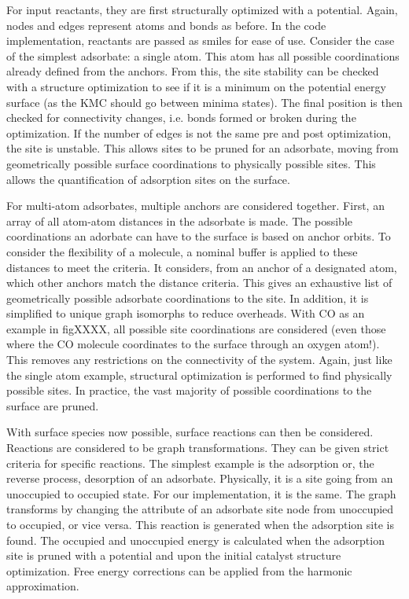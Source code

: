 \documentclass[journal=jacsat,manuscript=article]{achemso}
\begin{document}
For input reactants, they are first structurally optimized with a potential.
Again, nodes and edges represent atoms and bonds as before.
In the code implementation, reactants are passed as smiles for ease of use.
Consider the case of the simplest adsorbate: a single atom.
This atom has all possible coordinations already defined from the anchors.
From this, the site stability can be checked with a structure optimization to see if it is a minimum on the potential energy surface (as the KMC should go between minima states).
The final position is then checked for connectivity changes, i.e. bonds formed or broken during the optimization.
If the number of edges is not the same pre and post optimization, the site is unstable.
This allows sites to be pruned for an adsorbate, moving from geometrically possible surface coordinations to physically possible sites.
This allows the quantification of adsorption sites on the surface.

For multi-atom adsorbates, multiple anchors are considered together.
First, an array of all atom-atom distances in the adsorbate is made.
The possible coordinations an adorbate can have to the surface is based on anchor orbits.
To consider the flexibility of a molecule, a nominal buffer is applied to these distances to meet the criteria.
It considers, from an anchor of a designated atom, which other anchors match the distance criteria.
This gives an exhaustive list of geometrically possible adsorbate coordinations to the site.
In addition, it is simplified to unique graph isomorphs  to reduce overheads.
With CO as an example in figXXXX, all possible site coordinations are considered (even those where the CO molecule coordinates to the surface through an oxygen atom!).
This removes any restrictions on the connectivity of the system.
Again, just like the single atom example, structural optimization is performed to find physically possible sites.
In practice, the vast majority of possible coordinations to the surface are pruned.

With surface species now possible, surface reactions can then be considered.
Reactions are considered to be graph transformations.
They can be given strict criteria for specific reactions.
The simplest example is the adsorption or, the reverse process, desorption of an adsorbate.
Physically, it is a site going from an unoccupied to occupied state.
For our implementation, it is the same.
The graph transforms by changing the attribute of an adsorbate site node from unoccupied to occupied, or vice versa.
This reaction is generated when the adsorption site is found.
The occupied and unoccupied energy is calculated when the adsorption site is pruned with a potential and upon the initial catalyst structure optimization.
Free energy corrections can be applied from the harmonic approximation.
\end{document}
